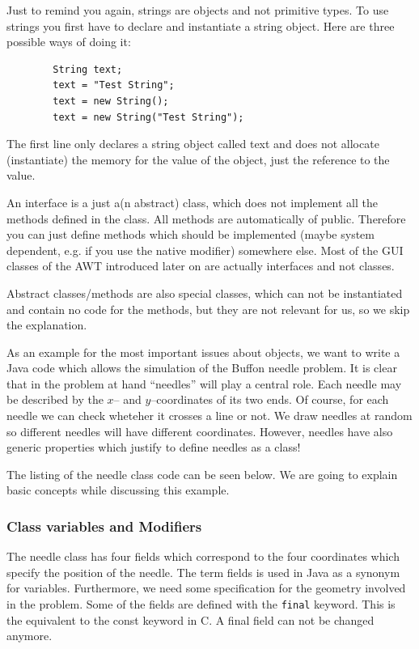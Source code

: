 Just to remind you again, strings are objects and not primitive 
types. To use strings you first have to declare and instantiate a string
object. Here are three possible ways of doing it:
\begin{verbatim}
        String text;
        text = "Test String";
        text = new String();
        text = new String("Test String");
\end{verbatim}
The first line only declares a string object called text and does not
allocate (instantiate) the memory for the value of the object, just
the reference to the value.

An interface is a just a(n abstract) class, which does not implement all the
methods defined in the class. All methods are automatically of public.
Therefore you can just define methods
which should be implemented (maybe system dependent, e.g. if you use
the native modifier) somewhere else.
Most of the GUI classes of the AWT introduced later on are
actually interfaces and not classes.

Abstract classes/methods 
are also special classes, which can not be instantiated
and contain no code for the methods,
but they are not relevant for us, so we skip the explanation.

As an example for the most important issues about objects, we want to
write a Java code which allows the simulation of the Buffon needle
problem. It is clear that in the problem at hand ``needles'' will play
a central role. Each needle may be described by the $x$-- and
$y$--coordinates of  its two ends. Of course, for each needle we can
check wheteher it crosses a line or not. We draw needles at random so
different needles will have different coordinates. However, needles
have also generic properties which justify to define needles as a class!


The listing of the needle class code can be seen below. We are going
to explain basic concepts while discussing this example.


\subsubsection{Class variables and Modifiers}
The needle class has four fields which correspond to the four
coordinates which specify the position of the needle. 
The term fields is used in Java as a synonym for variables.
Furthermore, we
need some specification for the geometry involved in the problem.
Some of the fields  are
defined with the \verb|final| keyword. This is the equivalent to the
const keyword in C. A final field can not be changed anymore.


